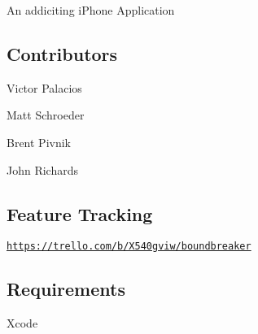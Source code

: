 An addiciting i\+Phone Application

\subsection*{Contributors }


\begin{DoxyItemize}
\item Victor Palacios
\item Matt Schroeder
\item Brent Pivnik
\item John Richards
\end{DoxyItemize}

\subsection*{Feature Tracking }

\href{https://trello.com/b/X540gviw/boundbreaker}{\tt https\+://trello.\+com/b/\+X540gviw/boundbreaker}

\subsection*{Requirements }

Xcode 
